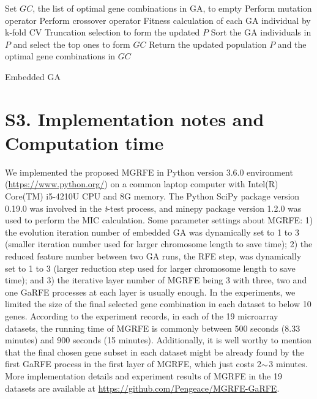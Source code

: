 \documentclass[10pt,journal,compsoc]{IEEEtran}
\begin{document}
	\begin{algorithm}
		\text{}
		Set $GC$, the list of optimal gene combinations in GA, to empty\;
		{
			Perform mutation operator\;
			Perform crossover operator\;
			Fitness calculation of each GA individual by k-fold CV\;
			Truncation selection to form the updated $P$\;
		}
		Sort the GA individuals in $P$ and select the top ones to form $GC$\;
		Return the updated population $P$ and the optimal gene combinations in $GC$\;
		\caption{Embedded GA}\label{Algo:GA}
	\end{algorithm}
	
	
	\section*{S3. Implementation notes and Computation time}

	We implemented the proposed MGRFE in Python version 3.6.0 environment (\url{https://www.python.org/}) on a common laptop computer with Intel(R) Core(TM) i5-4210U CPU and 8G memory. The Python SciPy package version 0.19.0 \cite{RN441} was involved in the \textit{t}-test process, and minepy package version 1.2.0 \cite{RN440} was used to perform the MIC calculation. Some parameter settings about MGRFE: 1) the evolution iteration number of embedded GA was dynamically set to 1 to 3 (smaller iteration number used for larger chromosome length to save time); 2) the reduced feature number between two GA runs, the RFE step, was dynamically set to 1 to 3 (larger reduction step used for larger chromosome length to save time); and 3) the iterative layer number of MGRFE being 3 with three, two and one GaRFE processes at each layer is usually enough. In the experiments, we limited the size of the final selected gene combination in each dataset to below 10 genes. According to the experiment records, in each of the 19 microarray datasets, the running time of MGRFE is commonly between 500 seconds (8.33 minutes) and 900 seconds (15 minutes). Additionally, it is well worthy to mention that the final chosen gene subset in each dataset might be already found by the first GaRFE process in the first layer of MGRFE, which just costs 2\(\scriptsize{\sim}\)3 minutes. More implementation details and experiment results of MGRFE in the 19 datasets are available at \url{https://github.com/Pengeace/MGRFE-GaRFE}.
	
\end{document}

